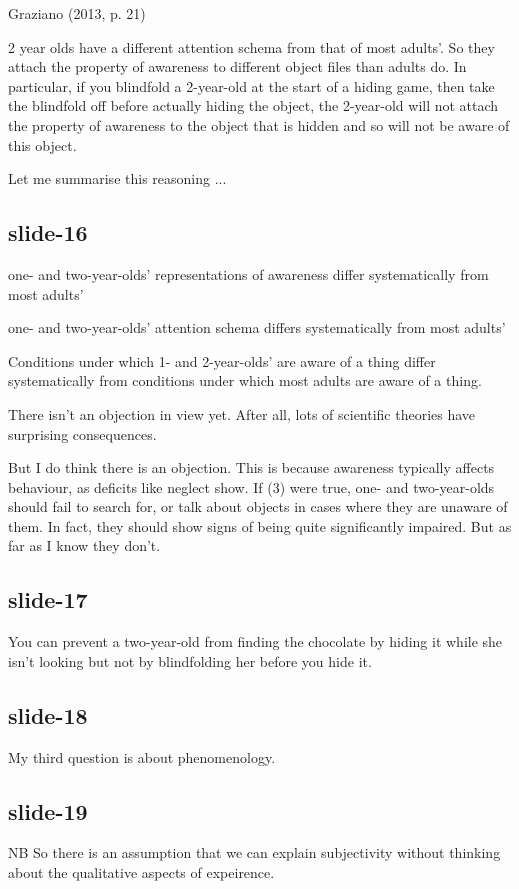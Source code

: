 \documentclass[14pt,\papersize]{extarticle}
\begin{document}
            
Graziano (2013, p. 21)  

 
2 year olds have a different attention schema from that of most adults’.
So they attach the property of awareness to different object files
than adults do.
In particular, if you blindfold a 2-year-old at the start of a hiding game,
then take the blindfold off before actually hiding the object,
the 2-year-old will not attach the property of awareness to the object 
that is hidden and so will not be aware of this object.
 
Let me summarise this reasoning ...
 
\subsection{slide-16}
one- and two-year-olds’ representations of awareness differ systematically from most adults’

                
one- and two-year-olds’ attention schema differs systematically from most adults’

                
Conditions under which 1- and 2-year-olds’ are aware of a thing differ systematically from conditions under which most adults are aware of a thing.
 
There isn't an objection in view yet.
After all, lots of scientific theories have surprising consequences.
 
But I do think there is an objection.
This is because awareness typically affects behaviour, as deficits like
neglect show.
If (3) were true, one- and two-year-olds should fail to search for, or talk
about objects in cases where they are unaware of them.  In fact, they should
show signs of being quite significantly impaired.  But as far as I know
they don’t.
 
\subsection{slide-17}
You can prevent a two-year-old from finding the chocolate by hiding it while
she isn't looking but not by blindfolding her before you hide it.
 
\subsection{slide-18}
My third question is about phenomenology.
 
\subsection{slide-19}
NB So there is an assumption that we can explain subjectivity  without
thinking about the qualitative aspects of expeirence.
 
\end{document}
